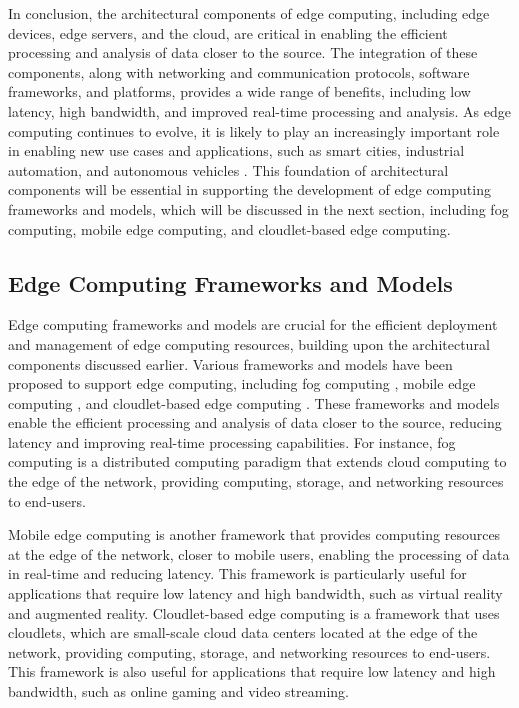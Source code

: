 \documentclass[11pt]{article}
\begin{document}
In conclusion, the architectural components of edge computing, including edge devices, edge servers, and the cloud, are critical in enabling the efficient processing and analysis of data closer to the source. The integration of these components, along with networking and communication protocols, software frameworks, and platforms, provides a wide range of benefits, including low latency, high bandwidth, and improved real-time processing and analysis. As edge computing continues to evolve, it is likely to play an increasingly important role in enabling new use cases and applications, such as smart cities, industrial automation, and autonomous vehicles \cite{ref22}. This foundation of architectural components will be essential in supporting the development of edge computing frameworks and models, which will be discussed in the next section, including fog computing, mobile edge computing, and cloudlet-based edge computing.

\subsection{Edge Computing Frameworks and Models}

Edge computing frameworks and models are crucial for the efficient deployment and management of edge computing resources, building upon the architectural components discussed earlier. Various frameworks and models have been proposed to support edge computing, including fog computing \cite{ref23}, mobile edge computing \cite{ref4}, and cloudlet-based edge computing \cite{ref24}. These frameworks and models enable the efficient processing and analysis of data closer to the source, reducing latency and improving real-time processing capabilities. For instance, fog computing \cite{ref23} is a distributed computing paradigm that extends cloud computing to the edge of the network, providing computing, storage, and networking resources to end-users.

Mobile edge computing \cite{ref4} is another framework that provides computing resources at the edge of the network, closer to mobile users, enabling the processing of data in real-time and reducing latency. This framework is particularly useful for applications that require low latency and high bandwidth, such as virtual reality and augmented reality. Cloudlet-based edge computing \cite{ref24} is a framework that uses cloudlets, which are small-scale cloud data centers located at the edge of the network, providing computing, storage, and networking resources to end-users. This framework is also useful for applications that require low latency and high bandwidth, such as online gaming and video streaming.
\end{document}
